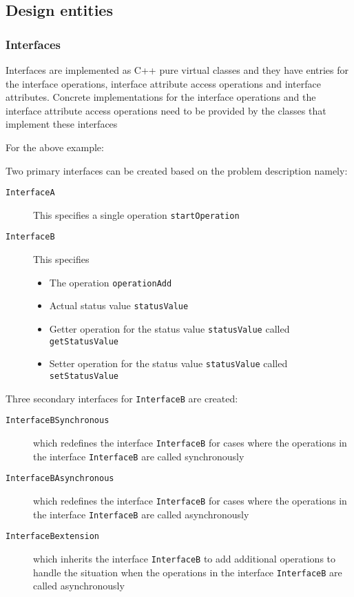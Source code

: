 \subsection{Design entities}
\subsubsection{Interfaces}
Interfaces are implemented as C++ pure virtual classes and they have entries for the interface operations, interface attribute access operations and interface attributes. Concrete implementations for the interface operations and the interface attribute access operations need to be provided by the classes that implement these interfaces

For the above example:
 
Two primary interfaces can be created based on the problem description namely: 
\begin{description}
\item [\texttt{InterfaceA}] This specifies a single operation \texttt{startOperation}
\item [\texttt{InterfaceB}] This specifies 
\begin{itemize}
\item The operation \texttt{operationAdd}
\item Actual status value \texttt{statusValue}
\item Getter operation for the status value \texttt{statusValue} called \texttt{getStatusValue}
\item Setter operation for the status value \texttt{statusValue} called \texttt{setStatusValue}
\end{itemize}
\end{description}

Three secondary interfaces for \texttt{InterfaceB} are created: 
\begin{description}
\item [\texttt{InterfaceB\textunderscore Synchronous}] which redefines the interface \texttt{InterfaceB} for cases where the operations in the interface \texttt{InterfaceB} are called synchronously
\item [\texttt{InterfaceB\textunderscore Asynchronous}] which redefines the interface \texttt{InterfaceB} for cases where the operations in the interface \texttt{InterfaceB} are called asynchronously
\item [\texttt{InterfaceB\textunderscore extension}] which inherits the interface \texttt{InterfaceB} to add additional operations to handle the situation when the operations in the interface \texttt{InterfaceB} are called asynchronously
\end{description}

